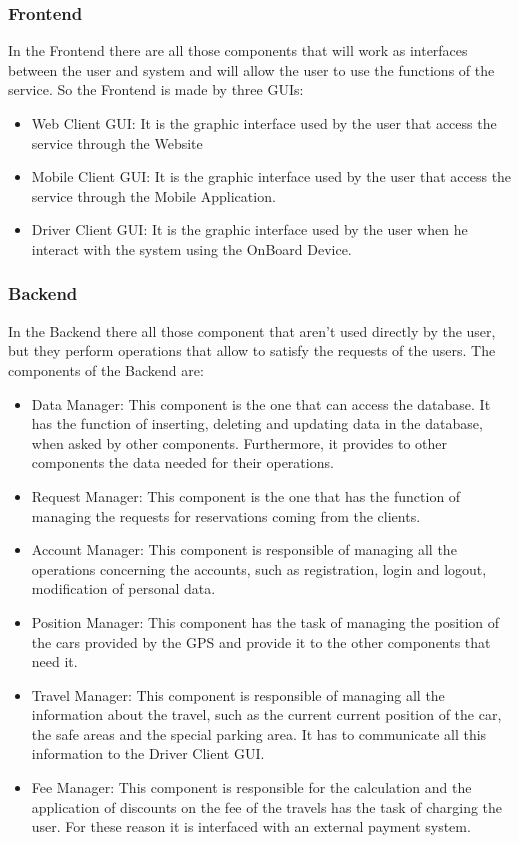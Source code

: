 \subsubsection{Frontend}
In the Frontend there are all those components that will work as interfaces between the user and system and will allow the user to use the functions of the service. So the Frontend is made by three GUIs:
\begin{itemize}
\item Web Client GUI: It is the graphic interface used by the user that access the service through the Website
\item Mobile Client GUI: It is the graphic interface used by the user that access the service through the Mobile Application.
\item Driver Client GUI: It is the graphic interface used by the user when he interact with the system using the OnBoard Device.
\end{itemize}

\subsubsection{Backend}
In the Backend there all those component that aren't used directly by the user, but they perform operations that allow to satisfy the requests of the users. The components of the Backend are:
\begin{itemize}
\item Data Manager: This component is the one that can access the database. It has the function of inserting, deleting and updating data in the database, when asked by other components. Furthermore, it provides to other components the data needed for their operations.
\item Request Manager: This component is the one that has the function of managing the requests for reservations coming from the clients.
\item Account Manager: This component is responsible of managing all the operations concerning the accounts, such as registration, login and logout, modification of personal data.
\item Position Manager: This component has the task of managing the position of the cars provided by the GPS and provide it to the other components that need it. 
\item Travel Manager: This component is responsible of managing all the information about the travel, such as the current current position of the car, the safe areas and the special parking area. It has to communicate all this information to the Driver Client GUI.
\item Fee Manager: This component is responsible for the calculation and the application of discounts on the fee of the travels has the task of charging the user. For these reason it is interfaced with an external payment system. 
\end{itemize}

